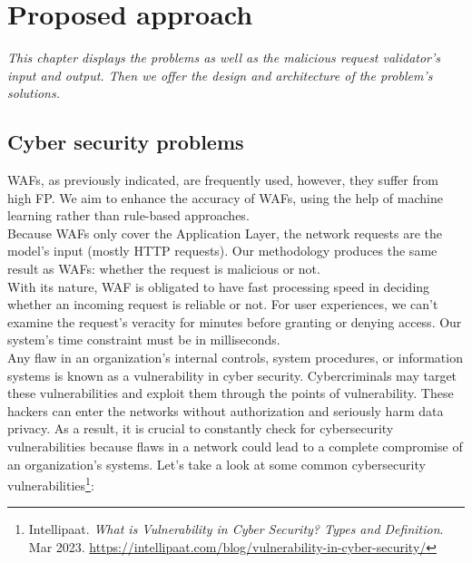 \chapter{Proposed approach}
\label{chap:proposed_approach}
	\textit{This chapter displays the problems as well as the malicious request validator's input and output. Then we offer the design and architecture of the problem's solutions.}
\minitoc

\section{Cyber security problems}
\label{Cyber problems}
WAFs, as previously indicated, are frequently used, however, they suffer from high FP. We aim to enhance the accuracy of WAFs, using the help of machine learning rather than rule-based approaches.  \\
Because WAFs only cover the Application Layer, the network requests are the model's input (mostly HTTP requests). Our methodology produces the same result as WAFs: whether the request is malicious or not.\\
With its nature, WAF is obligated to have fast processing speed in deciding whether an incoming request is reliable or not. For user experiences, we can't examine the request's veracity for minutes before granting or denying access. Our system's time constraint must be in milliseconds.\\
Any flaw in an organization's internal controls, system procedures, or information systems is known as a vulnerability in cyber security. Cybercriminals may target these vulnerabilities and exploit them through the points of vulnerability.
These hackers can enter the networks without authorization and seriously harm data privacy. As a result, it is crucial to constantly check for cybersecurity vulnerabilities because flaws in a network could lead to a complete compromise of an organization's systems.
Let's take a look at some common cybersecurity vulnerabilities\footnote{
    Intellipaat. \textit{What is Vulnerability in Cyber Security? Types and Definition}.
    Mar 2023.
    \url{https://intellipaat.com/blog/vulnerability-in-cyber-security/}
}:
